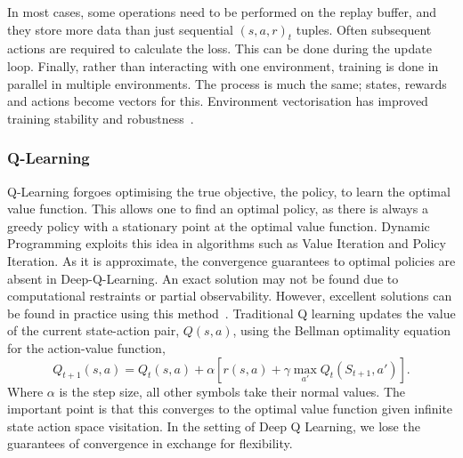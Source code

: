 In most cases, some operations need to be performed on the replay buffer, and they store more data than just sequential $(s, a,r)_t$ tuples. Often subsequent actions are required to calculate the loss. This can be done during the update loop. Finally, rather than interacting with one environment, training is done in parallel in multiple environments. The process is much the same; states, rewards and actions become vectors for this. Environment vectorisation has improved training stability and robustness~\cite{minh2016asynchronous}.

\subsubsection{Q-Learning}
Q-Learning forgoes optimising the true objective, the policy, to learn the optimal value function. This allows one to find an optimal policy, as there is always a greedy policy with a stationary point at the optimal value function. Dynamic Programming exploits this idea in algorithms such as Value Iteration\cite{bellamn1957mdp} and Policy Iteration\cite{howard1960dynamic}. As it is approximate, the convergence guarantees to optimal policies are absent in Deep-Q-Learning. An exact solution may not be found due to computational restraints or partial observability. However, excellent solutions can be found in practice using this method~\cite{mnih2013playing}. Traditional Q learning updates the value of the current state-action pair, $Q(s, a)$, using the Bellman optimality equation for the action-value function,
\begin{equation}
	Q_{t+1}(s, a) = Q_t(s,a) + \alpha \left[ r(s, a) + \gamma \max_{a'} Q_t(S_{t+1}, a') \right].
\end{equation}
Where $\alpha$ is the step size, all other symbols take their normal values. The important point is that this converges to the optimal value function given infinite state action space visitation. In the setting of Deep Q Learning, we lose the guarantees of convergence in exchange for flexibility.

